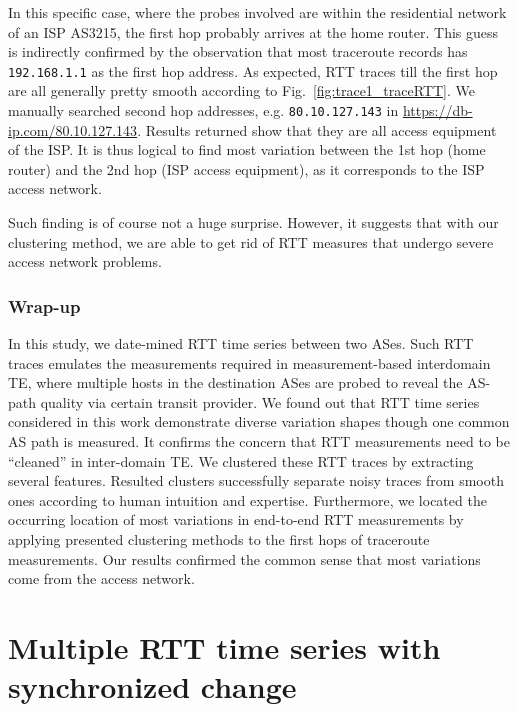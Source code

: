 In this specific case, where the probes involved are within the residential network of an ISP AS3215, the first hop probably arrives at the home router. This guess is indirectly confirmed by the observation that most traceroute records has \texttt{192.168.1.1} as the first hop address. As expected, RTT traces till the first hop are all generally pretty smooth according to Fig.~\ref{fig:trace1_traceRTT}. We manually searched second hop addresses, e.g. \texttt{80.10.127.143} in \url{https://db-ip.com/80.10.127.143}. Results returned show that they are all access equipment of the ISP.
It is thus logical to find most variation between the 1st hop (home router) and the 2nd hop (ISP access equipment), as it corresponds to the ISP access network.  

Such finding is of course not a huge surprise.%
However, it suggests that with our clustering method, we are able to get rid of RTT measures that undergo severe access network problems. 

\subsubsection*{Wrap-up}
In this study, we date-mined RTT time series between two ASes. 
Such RTT traces emulates the measurements required in measurement-based interdomain TE, where multiple hosts in the destination ASes are probed to reveal the AS-path quality via certain transit provider.
We found out that RTT time series considered in this work demonstrate diverse variation shapes though one common AS path is measured.
It confirms the concern that RTT measurements need to be ``cleaned'' in inter-domain TE.
We clustered these RTT traces by extracting %
several features. 
Resulted clusters successfully separate noisy traces from smooth ones according to human intuition and expertise.
Furthermore, we located the occurring location of most variations in end-to-end RTT measurements by applying presented clustering methods to the first hops of traceroute measurements.
Our results confirmed the common sense that most variations come from the access network.

\section{Multiple RTT time series with synchronized change}
\label{sec:ripe_case_study}

